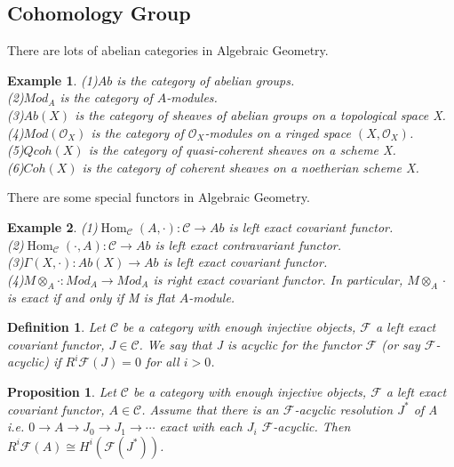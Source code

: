 \documentclass{ctexart}
\newtheorem{definition}{Definition}[section]
\newtheorem{proposition}{Proposition}[section]
\newtheorem{example}{Example}[section]
\renewcommand{\hom}{\operatorname{Hom}}
\begin{document}
\subsection{Cohomology Group}
There are lots of abelian categories in Algebraic Geometry.
\begin{example}
    (1)$Ab$ is the category of abelian groups. \\
    (2)$Mod_{A}$ is the category of $A$-modules. \\
    (3)$Ab(X)$ is the category of sheaves of abelian groups on a topological space X. \\
    (4)$Mod(\mathcal{O}_{X})$ is the category of $\mathcal{O}_{X}$-modules on a ringed space $(X, \mathcal{O}_{X})$. \\
    (5)$Qcoh(X)$ is the category of quasi-coherent sheaves on a scheme X. \\
    (6)$Coh(X)$ is the category of coherent sheaves on a noetherian scheme X.
\end{example}
There are some special functors in Algebraic Geometry.
\begin{example}
    (1)$\hom_{\mathcal{C}}(A, \cdot): \mathcal{C} \longrightarrow Ab$ is left exact covariant functor. \\
    (2)$\hom_{\mathcal{C}}(\cdot, A): \mathcal{C} \longrightarrow Ab$ is left exact contravariant functor. \\
    (3)$\Gamma(X, \cdot): Ab(X) \longrightarrow Ab$ is left exact covariant functor. \\
    (4)$M \otimes_{A} \cdot: Mod_{A} \longrightarrow Mod_{A}$ is right exact covariant functor.
    In particular, $M \otimes_{A} \cdot$ is exact if and only if M is flat $A$-module. 
\end{example}
\begin{definition}
    Let $\mathcal{C}$ be a category with enough injective objects, $\mathcal{F}$ a left exact covariant functor, $J\in \mathcal{C}$.
    We say that J is acyclic for the functor $\mathcal{F}$ (or say $\mathcal{F}$-acyclic) if $R^{i}\mathcal{F}(J) = 0$ for all $i > 0$.
\end{definition}
\begin{proposition}
    Let $\mathcal{C}$ be a category with enough injective objects, $\mathcal{F}$ a left exact covariant functor, $A\in \mathcal{C}$.
    Assume that there is an $\mathcal{F}$-acyclic resolution $J^{\ast}$ of A i.e. $0 \longrightarrow A \longrightarrow J_{0} \longrightarrow J_{1} \longrightarrow \cdots$ exact with each $J_{i}$ $\mathcal{F}$-acyclic.
    Then $R^{i}\mathcal{F}(A) \cong H^{i}(\mathcal{F}(J^{\ast}))$.
    \label{Proposition 7.1} 
\end{proposition}
\end{document}
